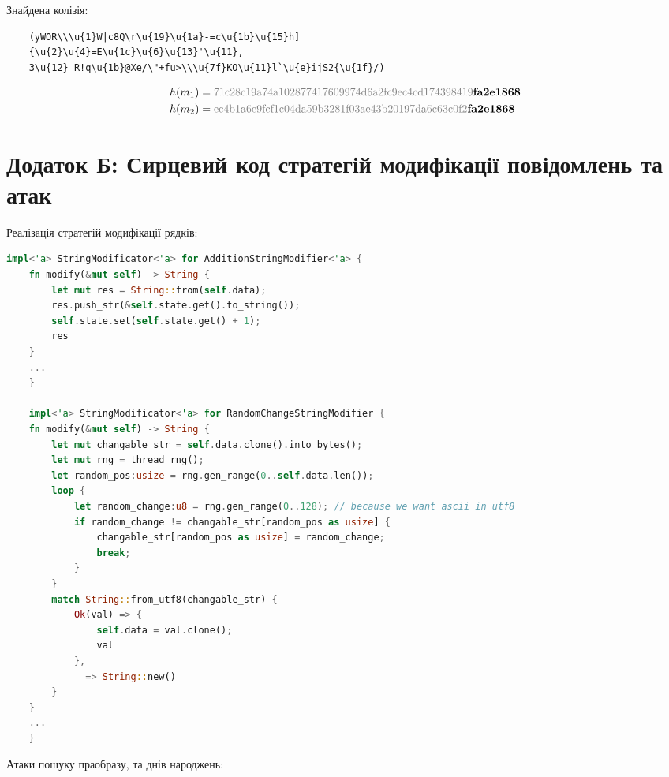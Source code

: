 \documentclass[12pt]{article}
\begin{document}
Знайдена колізія: 
\begin{verbatim}
    (yWOR\\\u{1}W|c8Q\r\u{19}\u{1a}-=c\u{1b}\u{15}h]
    {\u{2}\u{4}=E\u{1c}\u{6}\u{13}'\u{11},
    3\u{12} R!q\u{1b}@Xe/\"+fu>\\\u{7f}KO\u{11}l`\u{e}ijS2{\u{1f}/)
\end{verbatim}

\begin{align*}
h(m_1) &= \textcolor{codegray}{\text{71c28c19a74a102877417609974d6a2fc9ec4cd174398419}}\text{\textbf{fa2e1868}} \\
h(m_2) &= \textcolor{codegray}{\text{ec4b1a6e9fcf1c04da59b3281f03ae43b20197da6c63c0f2}}\text{\textbf{fa2e1868}}
\end{align*}

\section{Додаток Б: Сирцевий код стратегій модифікації повідомлень та атак}

Реалізація стратегій модифікації рядків:
\begin{lstlisting}[language=rust]
    impl<'a> StringModificator<'a> for AdditionStringModifier<'a> {
    fn modify(&mut self) -> String {
        let mut res = String::from(self.data);
        res.push_str(&self.state.get().to_string());
        self.state.set(self.state.get() + 1);
        res
    }
    ...
    }

    impl<'a> StringModificator<'a> for RandomChangeStringModifier {
    fn modify(&mut self) -> String {
        let mut changable_str = self.data.clone().into_bytes();
        let mut rng = thread_rng();
        let random_pos:usize = rng.gen_range(0..self.data.len());
        loop {
            let random_change:u8 = rng.gen_range(0..128); // because we want ascii in utf8
            if random_change != changable_str[random_pos as usize] {
                changable_str[random_pos as usize] = random_change;
                break;
            }
        }
        match String::from_utf8(changable_str) {
            Ok(val) => {
                self.data = val.clone();
                val
            },
            _ => String::new()
        }
    }
    ...
    }
\end{lstlisting}

Атаки пошуку праобразу, та днів народжень:
\end{document}
